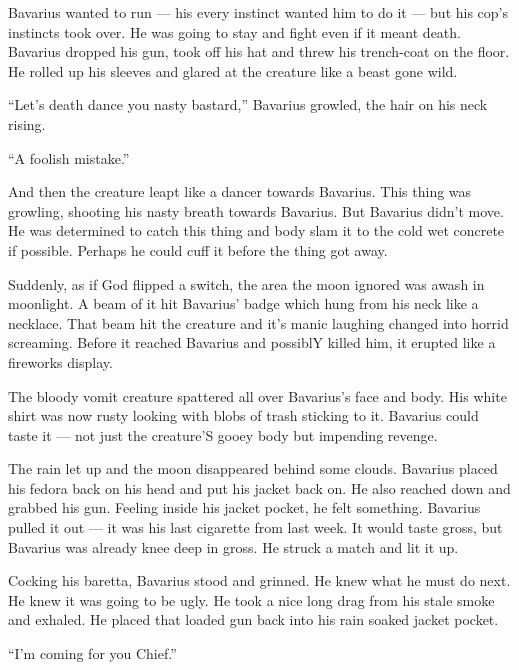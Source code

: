 Bavarius wanted to run --- his every instinct wanted him to do
it --- but his cop's instincts took over. He was going to stay
and fight even if it meant death. Bavarius dropped his gun, took
off his hat and threw his trench-coat on the floor. He rolled up
his sleeves and glared at the creature like a beast gone
wild.



``Let's death dance you nasty bastard,'' Bavarius
growled, the hair on his neck rising.



``A foolish mistake.''



And then the creature leapt like a dancer towards Bavarius. This
thing was growling, shooting his nasty breath towards Bavarius. But
Bavarius didn't move. He was determined to catch this thing and
body slam it to the cold wet concrete if possible. Perhaps he could
cuff it before the thing got away.



Suddenly, as if God flipped a switch, the area the moon ignored was
awash in moonlight. A beam of it hit Bavarius' badge which hung
from his neck like a necklace. That beam hit the creature and it's
manic laughing changed into horrid screaming. Before it reached
Bavarius and possiblY killed him, it erupted like a fireworks
display.



The bloody vomit creature spattered all over Bavarius's face and
body. His white shirt was now rusty looking with blobs of trash
sticking to it. Bavarius could taste it --- not just the
creature'S gooey body but impending revenge.



The rain let up and the moon disappeared behind some clouds.
Bavarius placed his fedora back on his head and put his jacket back
on. He also reached down and grabbed his gun. Feeling inside his
jacket pocket, he felt something. Bavarius pulled it out --- it
was his last cigarette from last week. It would taste gross, but
Bavarius was already knee deep in gross. He struck a match and lit
it up.



Cocking his baretta, Bavarius stood and grinned. He knew what he
must do next. He knew it was going to be ugly. He took a nice long
drag from his stale smoke and exhaled. He placed that loaded gun
back into his rain soaked jacket pocket.



``I'm coming for you Chief.'' 

 



